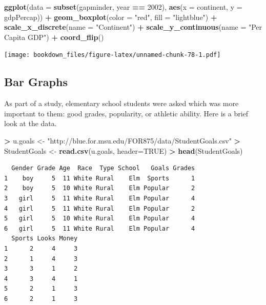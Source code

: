 \documentclass[]{krantz}
\makeatletter
\newenvironment{Shaded}{\begin{snugshade}}{\end{snugshade}}
\newcommand{\KeywordTok}[1]{\textcolor[rgb]{0.27,0.27,0.27}{\textbf{#1}}}
\newcommand{\DataTypeTok}[1]{\textcolor[rgb]{0.27,0.27,0.27}{#1}}
\newcommand{\DecValTok}[1]{\textcolor[rgb]{0.06,0.06,0.06}{#1}}
\newcommand{\StringTok}[1]{\textcolor[rgb]{0.5,0.5,0.5}{#1}}
\newcommand{\OtherTok}[1]{\textcolor[rgb]{0.37,0.37,0.37}{#1}}
\newcommand{\OperatorTok}[1]{\textcolor[rgb]{0.43,0.43,0.43}{\textbf{#1}}}
\newcommand{\NormalTok}[1]{#1}
\newenvironment{kframe}{%
\medskip{}
\setlength{\fboxsep}{.8em}
 \def\at@end@of@kframe{}%
 \ifinner\ifhmode%
  \def\at@end@of@kframe{\end{minipage}}%
  \begin{minipage}{\columnwidth}%
 \fi\fi%
 \def\FrameCommand##1{\hskip\@totalleftmargin \hskip-\fboxsep
 \colorbox{shadecolor}{##1}\hskip-\fboxsep
     \hskip-\linewidth \hskip-\@totalleftmargin \hskip\columnwidth}%
 \MakeFramed {\advance\hsize-\width
   \@totalleftmargin\z@ \linewidth\hsize
   \@setminipage}}%
 {\par\unskip\endMakeFramed%
 \at@end@of@kframe}
\renewenvironment{Shaded}{\begin{kframe}}{\end{kframe}}
\makeatother
\begin{document}
\begin{Shaded}
\begin{Highlighting}[]
\KeywordTok{ggplot}\NormalTok{(}\DataTypeTok{data =} \KeywordTok{subset}\NormalTok{(gapminder,  year }\OperatorTok{==}\StringTok{ }\DecValTok{2002}\NormalTok{), }
       \KeywordTok{aes}\NormalTok{(}\DataTypeTok{x =}\NormalTok{ continent, }\DataTypeTok{y =}\NormalTok{ gdpPercap)) }\OperatorTok{+}\StringTok{ }
\StringTok{    }\KeywordTok{geom_boxplot}\NormalTok{(}\DataTypeTok{color =} \StringTok{"red"}\NormalTok{, }\DataTypeTok{fill =} \StringTok{"lightblue"}\NormalTok{) }\OperatorTok{+}\StringTok{ }
\StringTok{    }\KeywordTok{scale_x_discrete}\NormalTok{(}\DataTypeTok{name =} \StringTok{"Continent"}\NormalTok{) }\OperatorTok{+}\StringTok{ }
\StringTok{    }\KeywordTok{scale_y_continuous}\NormalTok{(}\DataTypeTok{name =} \StringTok{"Per Capita GDP"}\NormalTok{) }\OperatorTok{+}\StringTok{ }\KeywordTok{coord_flip}\NormalTok{()}
\end{Highlighting}
\end{Shaded}

\texttt{[image: bookdown\_files/figure-latex/unnamed-chunk-78-1.pdf]}

\subsection{Bar Graphs}\label{bar-graphs}

As part of a study, elementary school students were asked which was more
important to them: good grades, popularity, or athletic ability. Here is
a brief look at the data.

\begin{Shaded}
\begin{Highlighting}[]
\OperatorTok{>}\StringTok{ }\NormalTok{u.goals <-}\StringTok{ "http://blue.for.msu.edu/FOR875/data/StudentGoals.csv"}
\OperatorTok{>}\StringTok{ }\NormalTok{StudentGoals <-}\StringTok{ }\KeywordTok{read.csv}\NormalTok{(u.goals, }\DataTypeTok{header=}\OtherTok{TRUE}\NormalTok{)}
\OperatorTok{>}\StringTok{ }\KeywordTok{head}\NormalTok{(StudentGoals)}
\end{Highlighting}
\end{Shaded}

\begin{verbatim}
  Gender Grade Age  Race  Type School   Goals Grades
1    boy     5  11 White Rural    Elm  Sports      1
2    boy     5  10 White Rural    Elm Popular      2
3   girl     5  11 White Rural    Elm Popular      4
4   girl     5  11 White Rural    Elm Popular      2
5   girl     5  10 White Rural    Elm Popular      4
6   girl     5  11 White Rural    Elm Popular      4
  Sports Looks Money
1      2     4     3
2      1     4     3
3      3     1     2
4      3     4     1
5      2     1     3
6      2     1     3
\end{verbatim}
\end{document}
